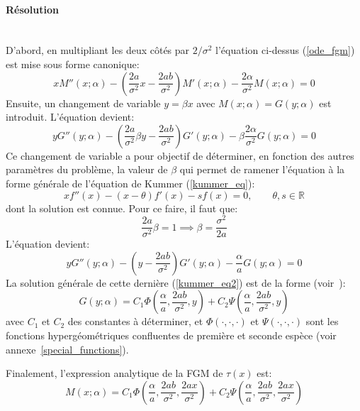\paragraph{Résolution}\phantom{}\\
D'abord, en multipliant les deux côtés par $2/\sigma^2$ l'équation ci-dessus (\ref{ode_fgm}) est mise sous forme canonique: 
\[
xM''(x;\alpha)-\left(\frac{2a}{\sigma^2}x-\frac{2ab}{\sigma^2}\right)M'(x;\alpha)-\frac{2\alpha}{\sigma^2} M(x;\alpha)=0
\]
Ensuite, un changement de variable $y=\beta x$ avec $M(x;\alpha)=G(y;\alpha)$ est introduit. L'équation devient: 
\[
yG''(y;\alpha)-\left(\frac{2a}{\sigma^2} \beta y - \frac{2ab}{\sigma^2}\right)G'(y;\alpha)-\beta\frac{2\alpha}{\sigma^2} G(y;\alpha) = 0
\]
Ce changement de variable a pour objectif de déterminer, en fonction des autres paramètres du problème, la valeur de $\beta$ qui permet de ramener l'équation à la forme générale de l'équation de Kummer (\ref{kummer_eq}): 
\begin{equation}\label{kummer_eq}
    xf''(x)-(x-\theta)f'(x)-s f(x)=0,\quad\quad \theta,s\in\mathds{R}
\end{equation}
dont la solution est connue. Pour ce faire, il faut que:
\[
\frac{2a}{\sigma^2} \beta=1\implies\beta=\frac{\sigma^2}{2a}
\]
L'équation devient:
\begin{equation}\label{kummer_eq2}
    yG''(y;\alpha)-\left(y-\frac{2ab}{\sigma^2}\right)G'(y;\alpha)-\frac{\alpha}{a}G(y;\alpha) = 0
\end{equation}
La solution générale de cette dernière (\ref{kummer_eq2}) est de la forme (voir~\cite{magnus1966}): 
\[G(y;\alpha) = C_1\Phi\left(\frac{\alpha}{a}, \frac{2ab}{\sigma^2}, y\right) + C_2\Psi\left(\frac{\alpha}{a}, \frac{2ab}{\sigma^2}, y\right)\]
avec $C_1$ et $C_2$ des constantes à déterminer, et $\Phi(\cdot, \cdot, \cdot)$ et $\Psi(\cdot, \cdot, \cdot)$ sont les fonctions hypergéométriques confluentes de première et seconde espèce (voir annexe~\ref{special_functions}).

Finalement, l'expression analytique de la \acs{FGM} de $\tau(x)$ est: 
\begin{equation}\label{sol_fgm}
    M(x;\alpha) = C_1\Phi\left(\frac{\alpha}{a}, \frac{2ab}{\sigma^2}, \frac{2ax}{\sigma^2}\right) + C_2\Psi\left(\frac{\alpha}{a}, \frac{2ab}{\sigma^2}, \frac{2ax}{\sigma^2}\right)
\end{equation}

